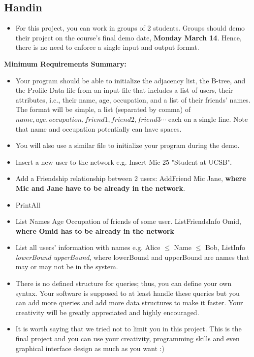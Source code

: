 \documentclass[times, 12pt]{article}
\begin{document}
\subsection{Handin}
\begin{itemize}
    \item For this project, you can work in groups of 2 students. Groups should demo their project on the course's final demo date, {\bf Monday March 14}. Hence, there is no need to enforce a single input and output format.
\end{itemize}
\textbf{Minimum Requirements Summary:}
\begin{itemize}
    \item Your program should be able to initialize the adjacency list, the B-tree, and the Profile Data file from an input file that includes a list of users, their attributes, i.e., their name, age, occupation, and a list of their friends' names. The format will be simple, a list (separated by comma) of\\
    $name,age,occupation,friend1,friend2,friend3 \cdots$ each on a single line. Note that name and occupation potentially can have spaces.
    \item You will also use a similar file to initialize your program during the demo.
    \item Insert a new user to the network e.g. Insert Mic 25 "Student at UCSB". 
    \item Add a Friendship relationship between 2 users: AddFriend Mic Jane, \textbf{where Mic and Jane have to be already in the network}.
    \item PrintAll
    \item List Names Age Occupation of friends of some user. ListFriendsInfo Omid, \textbf{where Omid has to be already in the network}
    \item List all users' information with names e.g. Alice $\le$ Name $\le$ Bob, ListInfo \textit{lowerBound} \textit{upperBound}, where lowerBound and upperBound are names that may or may not be in the system. 
    \item There is no defined structure for queries; thus, you can define your own syntax. Your software is supposed to at least handle these queries but you can add more queries and add more data structures to make it faster. Your creativity will be greatly appreciated and highly encouraged.
    \item It is worth saying that we tried not to limit you in this project. This is the final project and you can use your creativity, programming skills and even graphical interface design as much as you want :)
\end{itemize}
\end{document}
